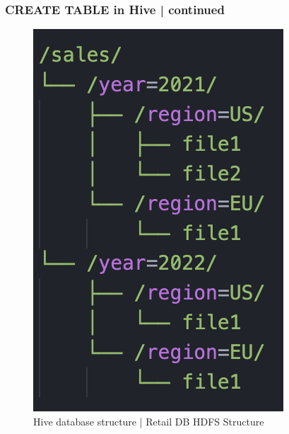\begin{frame}[fragile]
\frametitle{CREATE TABLE in Hive | continued}
\vspace{-0.5cm}\begin{tcolorbox}[colback=white,colframe=black,title= Part 8: Table Partitions]
\small
\vspace{-0.2cm}
\begin{figure}
	\includegraphics[width=\textwidth,height=.6\textheight,keepaspectratio]{./Figures/chapter-03/Screenshot_partitioned_example.png}
	\caption{Hive database structure | Retail DB HDFS Structure}	
	\end{figure}	
\end{tcolorbox}
	
\end{frame}

